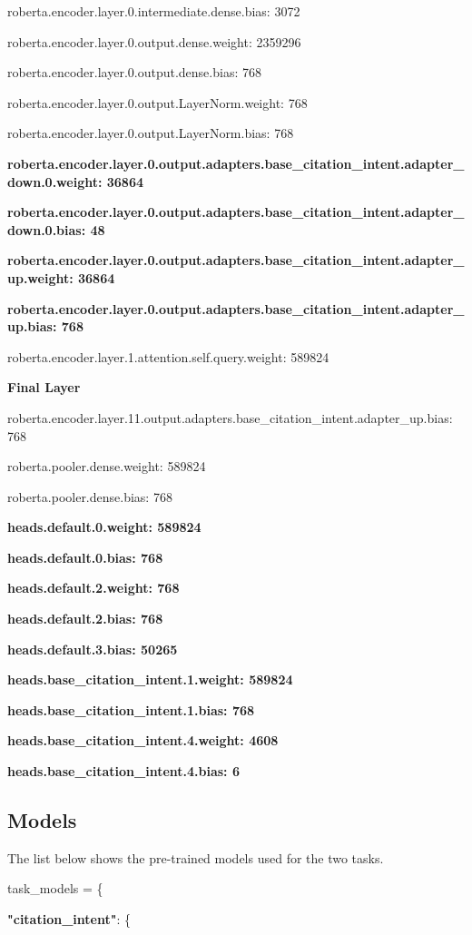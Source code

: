 \documentclass[draft,10pt,twocolumn,letterpaper]{article}
\begin{document}
roberta.encoder.layer.0.intermediate.dense.bias: 3072

roberta.encoder.layer.0.output.dense.weight: 2359296

roberta.encoder.layer.0.output.dense.bias: 768

roberta.encoder.layer.0.output.LayerNorm.weight: 768

roberta.encoder.layer.0.output.LayerNorm.bias: 768

\textbf{roberta.encoder.layer.0.output.adapters.base\_citation\_intent.adapter\_down.0.weight: 36864}

\textbf{roberta.encoder.layer.0.output.adapters.base\_citation\_intent.adapter\_down.0.bias: 48}

\textbf{roberta.encoder.layer.0.output.adapters.base\_citation\_intent.adapter\_up.weight: 36864}

\textbf{roberta.encoder.layer.0.output.adapters.base\_citation\_intent.adapter\_up.bias: 768}

roberta.encoder.layer.1.attention.self.query.weight: 589824

\textbf{Final Layer}

roberta.encoder.layer.11.output.adapters.base\_citation\_intent.adapter\_up.bias: 768

roberta.pooler.dense.weight: 589824

roberta.pooler.dense.bias: 768

\textbf{heads.default.0.weight: 589824}

\textbf{heads.default.0.bias: 768}

\textbf{heads.default.2.weight: 768}

\textbf{heads.default.2.bias: 768}

\textbf{heads.default.3.bias: 50265}

\textbf{heads.base\_citation\_intent.1.weight: 589824}

\textbf{heads.base\_citation\_intent.1.bias: 768}

\textbf{heads.base\_citation\_intent.4.weight: 4608}

\textbf{heads.base\_citation\_intent.4.bias: 6}

\subsection{Models}
The list below shows the pre-trained models used for the two tasks.

task\_models = \{

    \textbf{"citation\_intent"}: \{
    
\end{document}
